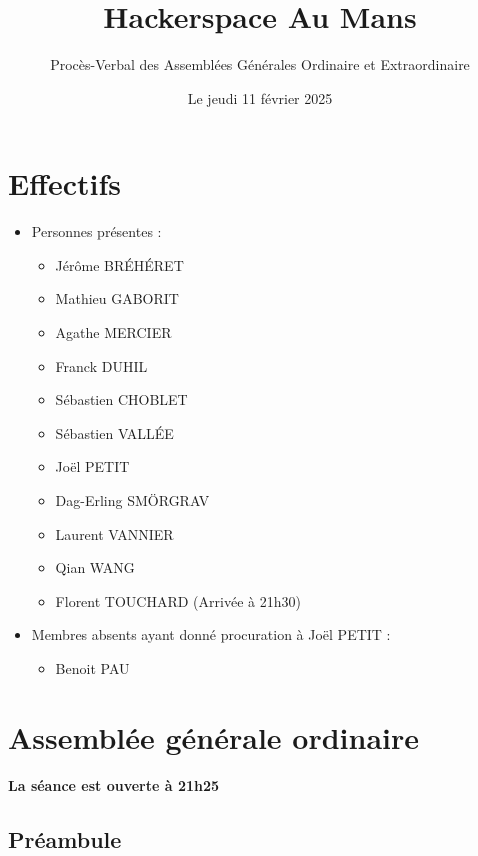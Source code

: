 \documentclass[a4paper, 11pt]{article}
\title{Hackerspace Au Mans}
\author{Procès-Verbal des Assemblées Générales Ordinaire et Extraordinaire}
\date{Le jeudi 11 février 2025}
\begin{document}
\maketitle

\section{Effectifs}

\begin{itemize}
	\item Personnes présentes :
		\begin{itemize}
            \item Jérôme BRÉHÉRET
            \item Mathieu GABORIT
            \item Agathe MERCIER
            \item Franck DUHIL
            \item Sébastien CHOBLET
            \item Sébastien VALLÉE
            \item Joël PETIT
            \item Dag-Erling SMÖRGRAV
            \item Laurent VANNIER
            \item Qian WANG
            \item Florent TOUCHARD (Arrivée à 21h30)
		\end{itemize}
	\item Membres absents ayant donné procuration à Joël PETIT :
		\begin{itemize}
			\item Benoit PAU
		\end{itemize}
\end{itemize}

\bigskip


\section{Assemblée générale ordinaire}
\textbf{La séance est ouverte à 21h25}
\subsection*{Préambule}
\end{document}
